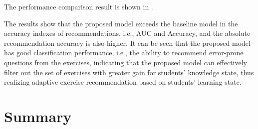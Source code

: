 The performance comparison result is shown in \tblname{\ref{tbl:ch4-exp-result}}.
\begin{table}[htb]
    \caption{The performance comparison between baseline and proposed models.}\label{tbl:ch4-exp-result}
    \centering
\end{table}



The results show that the proposed model exceeds the baseline model in the accuracy indexes of recommendations, i.e., AUC and Accuracy, and the absolute recommendation accuracy is also higher. It can be seen that the proposed model has good classification performance, i.e., the ability to recommend error-prone questions from the exercises, indicating that the proposed model can effectively filter out the set of exercises with greater gain for students' knowledge state, thus realizing adaptive exercise recommendation based on students' learning state.



\section{Summary}

